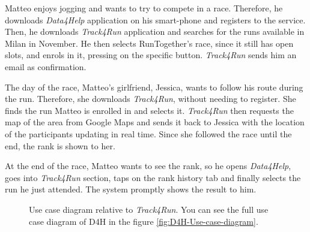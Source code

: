         Matteo enjoys jogging and wants to try to compete in a race. Therefore, he downloads \emph{Data4Help} application on his smart-phone and registers to the service. Then, he downloads \emph{Track4Run} application and searches for the runs available in Milan in November. He then selects RunTogether's race, since it still has open slots, and enrols in it, pressing on the specific button. \emph{Track4Run} sends him an email as confirmation.
        
        The day of the race, Matteo's girlfriend, Jessica, wants to follow his route during the run. Therefore, she downloads \emph{Track4Run}, without needing to register. She finds the run Matteo is enrolled in and selects it. \emph{Track4Run} then requests the map of the area from Google Maps and sends it back to Jessica with the location of the participants updating in real time. Since she followed the race until the end, the rank is shown to her.
        
        At the end of the race, Matteo wants to see the rank, so he opens \emph{Data4Help}, goes into \emph{Track4Run} section, taps on the rank history tab and finally selects the run he just attended. The system promptly shows the result to him.
        
        \begin{figure}[H]
            \centering
            \caption{Use case diagram relative to \emph{Track4Run}. You can see the full use case diagram of D4H in the figure \ref{fig:D4H-Use-case-diagram}.}
            \label{fig:T4R-Use-case-diagram}
        \end{figure}        
        
